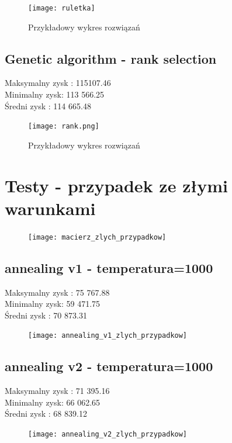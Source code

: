 \documentclass{article}
\begin{document}
\begin{figure}[H]
	\centering
	\texttt{[image: ruletka]}
	\caption{Przykładowy wykres rozwiązań}
	\label{fig:ruletka}
\end{figure}



\subsection{Genetic algorithm - rank selection}
Maksymalny zysk : 115107.46\\
Minimalny zysk: 113 566.25 \\
Średni zysk : 114 665.48\\

\begin{figure}[H]
	\centering
	\texttt{[image: rank.png]}
	\caption{Przykładowy wykres rozwiązań}
	\label{fig:rank}
\end{figure}


\section{Testy - przypadek ze złymi warunkami}

\begin{figure}[H]
	\centering
	\texttt{[image: macierz\_zlych\_przypadkow]}
	\caption{}
	\label{fig:macierzzlychprzypadkow}
\end{figure}


\subsection{annealing v1 - temperatura=1000}
Maksymalny zysk : 75 767.88\\
Minimalny zysk: 59 471.75 \\
Średni zysk : 70 873.31

\begin{figure}[H]
	\centering
	\texttt{[image: annealing\_v1\_zlych\_przypadkow]}
	\caption{}
	\label{fig:annealingv1zlychprzypadkow}
\end{figure}


\subsection{annealing v2 - temperatura=1000}
Maksymalny zysk : 71 395.16\\
Minimalny zysk: 66 062.65 \\
Średni zysk : 68 839.12

\begin{figure}[H]
	\centering
	\texttt{[image: annealing\_v2\_zlych\_przypadkow]}
	\caption{}
	\label{fig:annealingv2zlychprzypadkow}
\end{figure}
\end{document}
